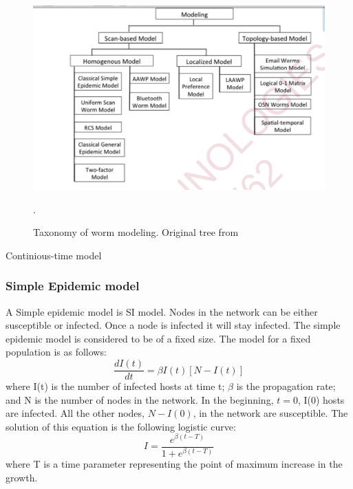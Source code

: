\begin{figure}
\centering
\includegraphics[scale=0.5]{Images/TreeModel.png} 
\caption{Taxonomy of worm modeling. Original tree from \cite{wang2014modeling}}.
\label{ShapeUp}
\end{figure}
Continious-time model
\subsubsection{Simple Epidemic model}
A Simple epidemic model is SI model. Nodes in the network can be either susceptible or infected.
Once a node is infected it will stay infected. 
The simple epidemic model is considered to be of a fixed size. The model for a fixed population is as follows:
\begin{equation}
\dfrac{d I(t)}{dt} = \beta I(t)[N-I(t)]
\end{equation} 
where I(t) is the number of infected hosts at time t; $\beta$ is the propagation rate; and N is the number of nodes in the network. In the beginning, $t=0$, I(0) hosts are infected. All the other nodes, $N - I(0)$, in the network are susceptible. 
The solution of this equation is the following logistic curve:
\begin{equation}
I = \dfrac{e^{\beta(t-T)}}{1+e^{\beta(t-T)}}
\end{equation}
where T is a time parameter representing the point of maximum increase in the
growth.\\


